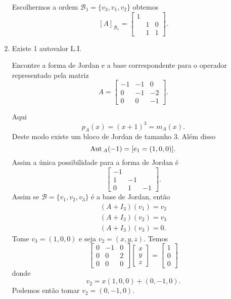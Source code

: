 \begin{enumerate}
\begin{solucao}
		Escolhermos a ordem $\mathcal{B}_1 = \{v_3, v_1, v_2\}$ obtemos
				\[
					[A]_{\mathcal{B}_1} = \begin{bmatrix}
				 			1 &  &\\
				 			& 1 & 0\\
				 			& 1 & 1
						\end{bmatrix}.
				\]

	\end{solucao}
	\item Existe 1 autovalor L.I.

	Encontre a forma de Jordan e a base correspondente para o operador representado pela matriz
	\[
		A = \begin{bmatrix}
			-1 & -1 & 0\\
			0 & -1 & -2\\
			0 & 0 & -1
		\end{bmatrix}.
	\]
	\begin{solucao}
	Aqui
	\[
		p_A(x) = (x + 1)^3 = m_A(x).
	\]
	Deste modo existe um bloco de Jordan de tamanho 3. Al\'em disso
	\[
		{\rm Aut\,}_A(-1) = [e_1 = (1,0,0)].
	\]
	Assim a \'unica possibilidade para a forma de Jordan \'e
	\[
		\begin{bmatrix}
			-1 & & \\
			1 & -1 &\\
			0 & 1 & -1
		\end{bmatrix}.
	\]
	Assim se $\mathcal{B} = \{v_1, v_2, v_3\}$ \'e a base de Jordan, ent\~ao
	\begin{align*}
		(A + I_3)(v_1) = v_2\\
		(A + I_3)(v_2) = v_3\\
		(A + I_3)(v_3) = 0.
	\end{align*}
	Tome $v_3 = (1,0,0)$ e seja $v_2 = (x,y,z)$. Temos
	\[
		\begin{bmatrix}
			0 & -1 & 0\\
			0 & 0 & 2\\
			0 & 0 & 0
		\end{bmatrix}\begin{bmatrix}
			x\\
			y\\
			z
		\end{bmatrix} = \begin{bmatrix}
			1\\
			0\\
			0
		\end{bmatrix}
	\]
	donde
	\[
		v_2 = x(1,0,0) + (0,-1,0).
	\]
	Podemos ent\~ao tomar $v_2 = (0,-1,0)$.


\end{solucao}
\end{enumerate}
